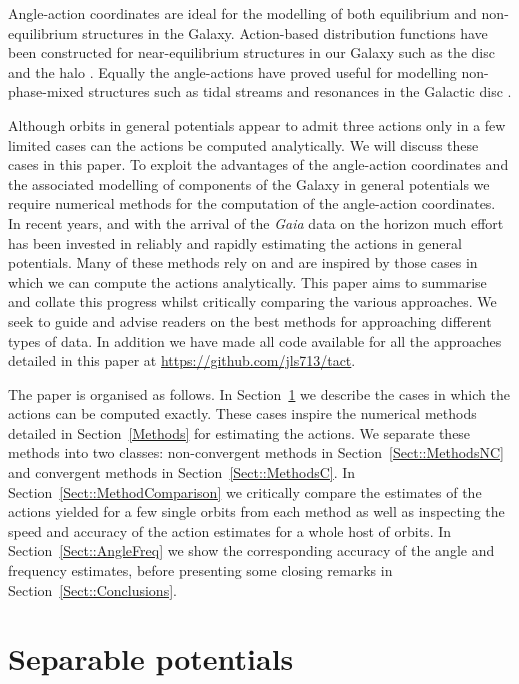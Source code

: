 \documentclass[useAMS,usenatbib,fleqn,a4paper]{mn2e}
\begin{document}
Angle-action coordinates are ideal for the modelling of both equilibrium and non-equilibrium structures in the Galaxy. Action-based distribution functions have been constructed for near-equilibrium structures in our Galaxy such as the disc \citep{Binney2010,BovyRix2013,Piffl2014} and the halo \citep{WilliamsEvans2015}. Equally the angle-actions have proved useful for modelling non-phase-mixed structures such as tidal streams \cite{HelmiWhite1999,SandersBinney2013a,Bovy2014,Sanders2014} and resonances in the Galactic disc \cite{Sellwood2010,McMillan2011}.

Although orbits in general potentials appear to admit three actions only in a few limited cases can the actions be computed analytically. We will discuss these cases in this paper. To exploit the advantages of the angle-action coordinates and the associated modelling of components of the Galaxy in general potentials we require numerical methods for the computation of the angle-action coordinates. In recent years, and with the arrival of the \emph{Gaia} data on the horizon much effort has been invested in reliably and rapidly estimating the actions in general potentials. Many of these methods rely on and are inspired by those cases in which we can compute the actions analytically. This paper aims to summarise and collate this progress whilst critically comparing the various approaches. We seek to guide and advise readers on the best methods for approaching different types of data. In addition we have made all code available for all the approaches detailed in this paper at \href{https://github.com/jls713/tact}{https://github.com/jls713/tact}.

The paper is organised as follows. In Section~\ref{Sect::Separable} we describe the cases in which the actions can be computed exactly. These cases inspire the numerical methods detailed in Section~\ref{Methods} for estimating the actions. We separate these methods into two classes: non-convergent methods in Section~\ref{Sect::MethodsNC} and convergent methods in Section~\ref{Sect::MethodsC}. In Section~\ref{Sect::MethodComparison} we critically compare the estimates of the actions yielded for a few single orbits from each method as well as inspecting the speed and accuracy of the action estimates for a whole host of orbits. In Section~\ref{Sect::AngleFreq} we show the corresponding accuracy of the angle and frequency estimates, before presenting some closing remarks in Section~\ref{Sect::Conclusions}.

\section{Separable potentials}\label{Sect::Separable}
\end{document}
